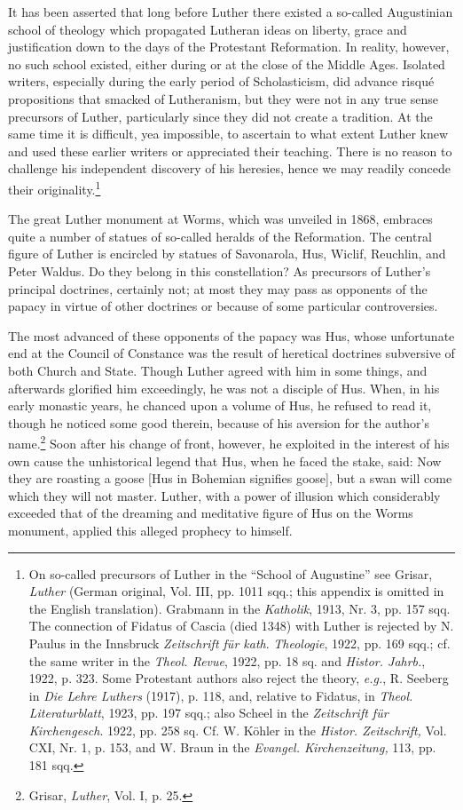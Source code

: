 It has been asserted that long before Luther there existed a so-called Augustinian
school of theology which propagated Lutheran
ideas on liberty, grace and justification down to the days of the
Protestant Reformation. In reality, however, no such school existed,
either during or at the close of the Middle Ages. Isolated writers,
especially during the early period of Scholasticism, did advance risqué
propositions that smacked of Lutheranism, but they were not in
any true sense precursors of Luther, particularly since they did not
create a tradition. At the same time it is difficult, yea impossible,
to ascertain to what extent Luther knew and used these earlier
writers or appreciated their teaching. There is no reason to challenge
his independent discovery of his heresies, hence we may readily concede
their originality.\footnote{On so-called precursors of Luther in the “School of Augustine” see Grisar, \textit{Luther}
(German original, Vol. III, pp. 1011 sqq.; this appendix is omitted in the English translation).
Grabmann in the \textit{Katholik}, 1913, Nr. 3, pp. 157 sqq. The connection of Fidatus
of Cascia (died 1348) with Luther is rejected by N. Paulus in the Innsbruck \textit{Zeitschrift
für kath}. \textit{Theologie}, 1922, pp. 169 sqq.; cf. the same writer in the \textit{Theol. Revue}, 1922,
pp. 18 sq. and \textit{Histor. Jahrb.}, 1922, p. 323. Some Protestant authors also reject the theory,
\textit{e.g.}, R. Seeberg in \textit{Die Lehre Luthers} (1917), p. 118, and, relative to Fidatus, in \textit{Theol.
Literaturblatt}, 1923, pp. 197 sqq.; also Scheel in the \textit{Zeitschrift für Kirchengesch}. 1922,
pp. 258 sq. Cf. W. Köhler in the \textit{Histor. Zeitschrift,} Vol. CXI, Nr. 1, p. 153, and W.
Braun in the \textit{Evangel. Kirchenzeitung,} 113, pp. 181 sqq.
}

The great Luther monument at Worms, which was unveiled in
1868, embraces quite a number of statues of so-called heralds of
the Reformation. The central figure of Luther is encircled by
statues of Savonarola, Hus, Wiclif, Reuchlin, and Peter Waldus.
Do they belong in this constellation? As precursors of Luther’s principal
doctrines, certainly not; at most they may pass as opponents
of the papacy in virtue of other doctrines or because of some particular
controversies.

The most advanced of these opponents of the papacy was Hus,
whose unfortunate end at the Council of Constance was the result
of heretical doctrines subversive of both Church and State. Though
Luther agreed with him in some things, and afterwards glorified him
exceedingly, he was not a disciple of Hus. When, in his early monastic
years, he chanced upon a volume of Hus, he refused to read
it, though he noticed some good therein, because of his aversion
for the author’s name.\footnote{Grisar, \textit{Luther}, Vol. I, p. 25.}
Soon after his change of front, however,
he exploited in the interest of his own cause the unhistorical legend
that Hus, when he faced the stake, said: Now they are roasting a
goose [Hus in Bohemian signifies goose], but a swan will come which
they will not master. Luther, with a power of illusion which considerably
exceeded that of the dreaming and meditative figure of
Hus on the Worms monument, applied this alleged prophecy to
himself.

